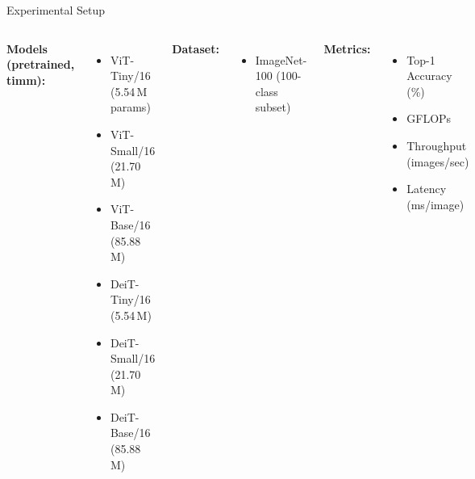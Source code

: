 \documentclass[aspectratio=169, 11pt]{beamer}
\begin{document}
\begin{frame}{Experimental Setup}
\begin{columns}[T]
\textbf{Models (pretrained, timm):}
\begin{itemize}
  \item ViT-Tiny/16 \quad(5.54\,M params)
  \item ViT-Small/16 \quad(21.70\,M)
  \item ViT-Base/16 \quad(85.88\,M)
  \item DeiT-Tiny/16 \quad(5.54\,M)
  \item DeiT-Small/16 \quad(21.70\,M)
  \item DeiT-Base/16 \quad(85.88\,M)
\end{itemize}

\textbf{Dataset:}
\begin{itemize}
  \item ImageNet-100 (100-class subset)
\end{itemize}

\vspace{0.3cm}
\textbf{Metrics:}
\begin{itemize}
  \item Top-1 Accuracy (\%)
  \item GFLOPs
  \item Throughput (images/sec)
  \item Latency (ms/image)
\end{itemize}
\end{columns}

\vspace{0.4cm}
\begin{center}
\end{center}
\end{frame}
\end{document}
